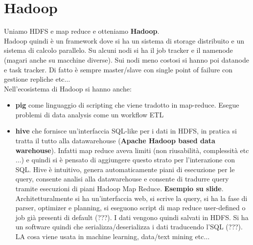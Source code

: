 \documentclass[a4paper,12pt, oneside]{book}
\begin{document}
\section{Hadoop}
Uniamo HDFS e map reduce e otteniamo \textbf{Hadoop}.\\
Hadoop quindi è un framework dove si ha un sistema di storage distribuito e un
sistema di calcolo parallelo. Su alcuni nodi si ha il job tracker e il namenode
(magari anche su macchine diverse). Sui nodi meno costosi si hanno poi datanode
e task tracker. Di fatto è sempre master/slave con single point of failure con
gestione repliche etc$\ldots$\\
Nell'ecosistema di Hadoop si hanno anche:
\begin{itemize}
  \item \textbf{pig} come linguaggio di scripting che viene tradotto in
  map-reduce. Esegue problemi di data analysis come un workflow ETL
  \item \textbf{hive} che fornisce un'interfaccia SQL-like per i dati in HDFS,
  in pratica si tratta il tutto alla datawarehouse (\textbf{Apache Hadoop based
    data warehouse}). Infatti map reduce aveva limiti (non riusabilità,
  complessità etc$\ldots$) e quindi si è pensato di aggiungere questo strato per
  l'interazione con SQL. Hive è intuitivo, genera automaticamente piani di
  esecuzione per le query, consente analisi alla datawarehouse e consente di
  tradurre query tramite esecuzioni di piani Hadoop Map Reduce. \textbf{Esempio
    su slide}. Architetturalmente si ha un'interfaccia web, si scrive la query,
  si ha la fase di parser, optimizer e planning, si eseguono script di map
  reduce user-defined o job già presenti di default (???). I dati vengono quindi 
  salvati in HDFS. Si ha un software quindi che serializza/deserializza i dati
  traducendo l'SQL (???). LA cosa viene usata in machine learning, data/text
  mining etc$\ldots$
\end{itemize}
\end{document}

